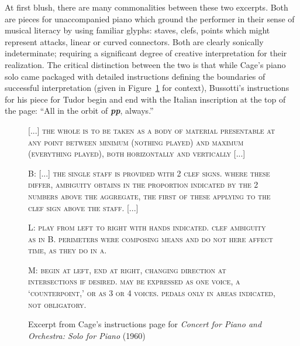         At first blush, there are many commonalities between these two excerpts. Both are pieces for unaccompanied piano which ground the performer in their sense of musical literacy by using familiar glyphs: staves, clefs, points which might represent attacks, linear or curved connectors. Both are clearly sonically indeterminate; requiring a significant degree of creative interpretation for their realization. The critical distinction between the two is that while Cage's piano solo came packaged with detailed instructions defining the boundaries of successful interpretation (given in Figure~\ref{fig:cagequote} for context), Bussotti's instructions for his piece for Tudor begin and end with the Italian inscription at the top of the page: ``All in the orbit of \textbf{\textit{pp}}, always.'' 

\begin{figure}[H]
    \begin{smallquote}
        \noindent \textsc{[...] the whole is to be taken as a body of material presentable at any point between minimum (nothing played) and maximum (everything played), both horizontally and vertically [...]}
    \end{smallquote}
        \vspace{-20pt}
    \begin{smallquote}
        \noindent \lettrine[lines=2, findent=3pt, nindent=0pt]{B}{:} \textsc{[...] the single staff is provided with 2 clef signs. where these differ, ambiguity obtains in the proportion indicated by the 2 numbers above the aggregate, the first of these applying to the clef sign above the staff.} [...]
    \end{smallquote}
        \vspace{-20pt}
    \begin{smallquote}
        \noindent \lettrine[lines=2, findent=3pt, nindent=0pt]{L}{:} \textsc{play from left to right with hands indicated. clef ambiguity as in B. perimeters were composing means and do not here affect time, as they do in a.}        
    \end{smallquote}
        \vspace{-20pt}
    \begin{smallquote}
        \noindent \lettrine[lines=2, findent=3pt, nindent=0pt]{M}{:} \textsc{begin at left, end at right, changing direction at intersections if desired. may be expressed as one voice, a `counterpoint,' or as 3 or 4 voices. pedals only in areas indicated, not obligatory.}\footnotemark
    \end{smallquote}
\captionsetup{width=.5\textwidth}
\caption{Excerpt from Cage's instructions page for \textit{Concert for Piano and Orchestra: Solo for Piano} (1960)}
\label{fig:cagequote}
\end{figure}
    
